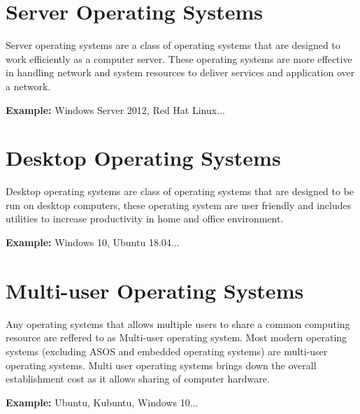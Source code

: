 \documentclass[a4,11pt]{article}
\begin{document}
\begin{multicols}{2}
  \section{Server Operating Systems}

  Server operating systems are a class of operating systems that are
  designed to work efficiently as a computer server. These operating
  systems are more effective in handling network and system resources
  to deliver services and application over a network.

  \textbf{Example:} Windows Server 2012, Red Hat Linux...
  \section{Desktop Operating Systems}
  Desktop operating systems are class of operating systems that are
  designed to be run on desktop computers, these operating system are
  user friendly and includes utilities to increase productivity in
  home and office environment.

  \textbf{Example:} Windows 10, Ubuntu 18.04...
  \section{Multi-user Operating Systems}
  Any operating systems that allows multiple users to share a common
  computing resource are reffered to as Multi-user operating
  system. Most modern operating systems (excluding ASOS and embedded
  operating systems) are multi-user operating systems. Multi user
  operating systems brings down the overall establishment cost as it
  allows sharing of computer hardware.

  \textbf{Example:} Ubuntu, Kubuntu, Windows 10...
\end{multicols}
\end{document}

